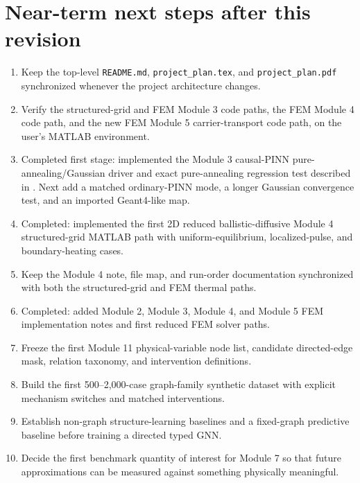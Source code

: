 \documentclass[11pt]{article}
\begin{document}
\section{Near-term next steps after this revision}
\begin{enumerate}[leftmargin=1.6em]
    \item Keep the top-level \texttt{README.md}, \texttt{project\_plan.tex}, and \texttt{project\_plan.pdf} synchronized whenever the project architecture changes.
    \item Verify the structured-grid and FEM Module 3 code paths, the FEM Module 4 code path, and the new FEM Module 5 carrier-transport code path, on the user's MATLAB environment.
    \item Completed first stage: implemented the Module 3 causal-PINN pure-annealing/Gaussian driver and exact pure-annealing regression test described in . Next add a matched ordinary-PINN mode, a longer Gaussian convergence test, and an imported Geant4-like map.
    \item Completed: implemented the first 2D reduced ballistic-diffusive Module 4 structured-grid MATLAB path with uniform-equilibrium, localized-pulse, and boundary-heating cases.
    \item Keep the Module 4 note, file map, and run-order documentation synchronized with both the structured-grid and FEM thermal paths.
    \item Completed: added Module 2, Module 3, Module 4, and Module 5 FEM implementation notes and first reduced FEM solver paths.
    \item Freeze the first Module 11 physical-variable node list, candidate directed-edge mask, relation taxonomy, and intervention definitions.
    \item Build the first 500--2,000-case graph-family synthetic dataset with explicit mechanism switches and matched interventions.
    \item Establish non-graph structure-learning baselines and a fixed-graph predictive baseline before training a directed typed GNN.
    \item Decide the first benchmark quantity of interest for Module 7 so that future approximations can be measured against something physically meaningful.
\end{enumerate}
\end{document}
